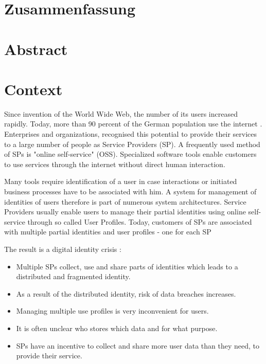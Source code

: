 \documentclass[
     12pt,         %
     a4paper,      %
     BCOR=10mm,version=first,     %
     DIV=14,version=first,        %
     ]{scrreprt}
\begin{document}
\chapter*{Zusammenfassung}

\newpage

\chapter*{Abstract}

\newpage

\tableofcontents
\cleardoublepage
{}

\chapter{Context}
Since invention of the World Wide Web, the number of its users increased rapidly. Today, more than 90 percent of the German population use the internet \cite{Onlinestudie}. Enterprises and organizations, recognised this potential to provide their services to a large number of people as Service Providers (SP). A frequently used method of SPs is "online self-service" (OSS). Specialized software tools enable customers to use services through the internet without direct human interaction.

Many tools require identification of a user in case interactions or initiated business processes have to be associated with him. A system for management of identities of users therefore is part of numerous system architectures. Service Providers usually enable users to manage their partial identities using online self-service through so called User Profiles. Today, customers of SPs are associated with multiple partial identities and user profiles - one for each SP

The result is a digital identity crisis \cite{IdentityCrisis}:
\begin{itemize}
    \item Multiple SPs collect, use and share parts of identities which leads to a distributed and fragmented identity.
    \item As a result of the distributed identity, risk of data breaches increases.
    \item Managing multiple use profiles is very inconvenient for users.
    \item It is often unclear who stores which data and for what purpose.
    \item SPs have an incentive to collect and share more user data than they need, to provide their service.
\end{itemize}
\end{document}
